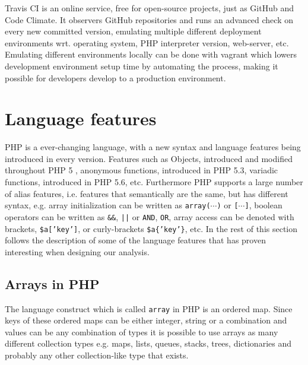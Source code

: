 Travis CI is an online service, free for open-source projects, just as GitHub and Code Climate. It observers GitHub repositories and runs an advanced check on every new committed version, emulating multiple different deployment environments wrt. operating system, PHP interpreter version, web-server, etc. Emulating different environments locally can be done with vagrant which lowers development environment setup time by automating the process, making it possible for developers develop to a production environment.


\section{Language features}
PHP is a ever-changing language, with a new syntax and language features being introduced in every version. Features such as Objects, introduced and modified throughout PHP 5 , anonymous functions, introduced in PHP 5.3, variadic functions, introduced in PHP 5.6, etc. Furthermore PHP supports a large number of alias features, i.e. features that semantically are the same, but has different syntax, e.g. array initialization can be written as \texttt{array($\cdots$)} or \texttt{[$\cdots$]}, boolean operators can be written as \texttt{\&\&}, \texttt{||} or \texttt{AND}, \texttt{OR}, array access can be denoted with brackets, \texttt{\$a['key']}, or curly-brackets \texttt{\$a\{'key'\}}, etc. In the rest of this section follows the description of some of the language features that has proven interesting when designing our analysis.

\subsection{Arrays in PHP}
The language construct which is called \texttt{array} in PHP is an ordered map. Since keys of these ordered maps can be either integer, string or a combination and values can be any combination of types it is possible to use arrays as many different collection types e.g. maps, lists, queues, stacks, trees, dictionaries and probably any other collection-like type that exists.

